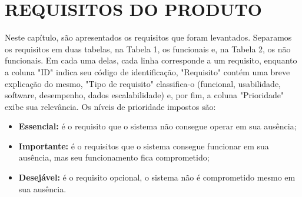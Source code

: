 \documentclass[
	12pt,				%
	openright,			%
	oneside,			    %
	a4paper,				%
	english,			%
	french,			%
	spanish,			%
	brazil			%
	]{abntex2}
\begin{document}
\chapter{REQUISITOS DO PRODUTO}
Neste capítulo, são apresentados os requisitos que foram levantados. Separamos os requisitos em duas tabelas, na Tabela 1, os funcionais e, na Tabela 2, os não funcionais. Em cada uma delas, cada linha corresponde a um requisito, enquanto a coluna "ID" indica seu código de identificação, "Requisito" contém uma breve explicação do mesmo, "Tipo de requisito" classifica-o (funcional, usabilidade, software, desempenho, dados escalabilidade) e, por fim, a coluna  "Prioridade" exibe sua relevância. Os níveis de prioridade impostos são:
\begin{itemize}
  \item \textbf{Essencial:} é o requisito que o sistema não consegue operar em sua ausência; 
  \item \textbf{Importante:} é o requisitos que o sistema consegue funcionar em sua ausência, mas seu funcionamento fica comprometido;
  \item \textbf{Desejável:} é o requisito opcional, o sistema não é comprometido mesmo em sua ausência.
\end{itemize}
\end{document}
